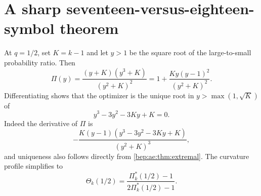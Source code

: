 \documentclass[11pt]{article}
\numberwithin{equation}{section}
\theoremstyle{definition}
\theoremstyle{remark}
\begin{document}
\section{A sharp seventeen-versus-eighteen-symbol theorem}\label{bep:ae:sec:half}
At $q=1/2$, set $K=k-1$ and let $y>1$ be the square root of the
large-to-small probability ratio. Then
\begin{equation}\label{bep:ae:eq:halfR}
 \Pi(y)=\frac{(y+K)(y^3+K)}{(y^2+K)^2}
     =1+\frac{Ky(y-1)^2}{(y^2+K)^2}.
\end{equation}
Differentiating shows that the optimizer is the unique root in
$y>\max(1,\sqrt K)$ of
\begin{equation}\label{bep:ae:eq:halfcubic}
 y^3-3y^2-3Ky+K=0.
\end{equation}
Indeed the derivative of $\Pi$ is
\[
 -\frac{K(y-1)(y^3-3y^2-3Ky+K)}{(y^2+K)^3},
\]
and uniqueness also follows directly from \cref{bep:ae:thm:extremal}.
The curvature profile simplifies to
\begin{equation}\label{bep:ae:eq:halftheta}
 \Theta_k(1/2)=\frac{\Pi^{*}_k(1/2)-1}{2\Pi^{*}_k(1/2)-1}.
\end{equation}
\end{document}
